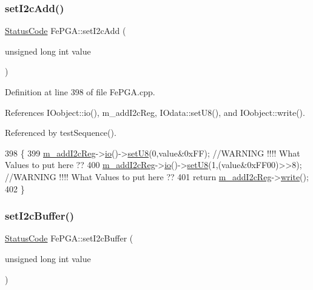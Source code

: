 \subsubsection{\texorpdfstring{set\+I2c\+Add()}{setI2cAdd()}}
{\footnotesize\ttfamily \hyperlink{classStatusCode}{Status\+Code} Fe\+P\+G\+A\+::set\+I2c\+Add (\begin{DoxyParamCaption}\item[{unsigned long int}]{value }\end{DoxyParamCaption})}



Definition at line 398 of file Fe\+P\+G\+A.\+cpp.



References I\+Oobject\+::io(), m\+\_\+add\+I2c\+Reg, I\+Odata\+::set\+U8(), and I\+Oobject\+::write().



Referenced by test\+Sequence().


\begin{DoxyCode}
398                                                     \{
399   \hyperlink{classFePGA_af3ef3467ba803e6d3b970ea8982d6246}{m\_addI2cReg}->\hyperlink{classIOobject_af04fb94137c3d86849f478ac5afab5d1}{io}()->\hyperlink{classIOdata_a6c4fb2f2af01889ada889c2b7aceb24d}{setU8}(0,value&0xFF); \textcolor{comment}{//WARNING !!!! What Values to put here ??}
400   \hyperlink{classFePGA_af3ef3467ba803e6d3b970ea8982d6246}{m\_addI2cReg}->\hyperlink{classIOobject_af04fb94137c3d86849f478ac5afab5d1}{io}()->\hyperlink{classIOdata_a6c4fb2f2af01889ada889c2b7aceb24d}{setU8}(1,(value&0xFF00)>>8); \textcolor{comment}{//WARNING !!!! What Values to put here
       ??}
401   \textcolor{keywordflow}{return} \hyperlink{classFePGA_af3ef3467ba803e6d3b970ea8982d6246}{m\_addI2cReg}->\hyperlink{classIOobject_a9f6984bc9f0fadcf800f1be2523ac744}{write}();
402 \}
\end{DoxyCode}
\mbox{\label{classFePGA_aaf52ed549f6b79d53f49c3f85c5fbad2}} 
\subsubsection{\texorpdfstring{set\+I2c\+Buffer()}{setI2cBuffer()}}
{\footnotesize\ttfamily \hyperlink{classStatusCode}{Status\+Code} Fe\+P\+G\+A\+::set\+I2c\+Buffer (\begin{DoxyParamCaption}\item[{unsigned long int}]{value }\end{DoxyParamCaption})}



